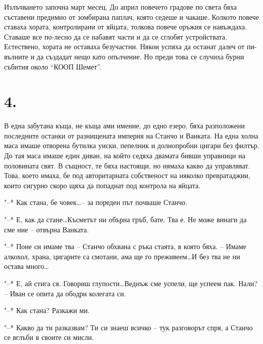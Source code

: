 \documentclass[ebook,openany,12pt]{memoir}
\begin{document}
Излъчването започна март месец. До април повечето градове по света бяха съставени предимно от зомбирана паплач, която седеше и чакаше. Колкото повече ставаха хората, контролирани от яйцата, толкова повече оръжия се навъждаха. Ставаше все по-лесно да се набавят части и да се сглобят устройствата. Естествено, хората не оставаха безучастни. Някои успяха да останат далеч от пи-вълните и да създадат нещо като опълчение. Но преди това се случиха бурни събития около ``КООП Шемет''.

\section*{4.}

В една забутана къща, не къща ами имение, до едно езеро, бяха разположени последните останки от разнищената империя на Станчо и Ванката. На една холна маса имаше отворена бутилка уиски, пепелник и долнопробни цигари без филтър. До тая маса имаше един диван, на който седяха двамата бивши управници на половината свят. В същност, те бяха настоящи, но нямаха какво да управляват. Това, което имаха, бе под авторитарната собственост на няколко превратаджии, които сигурно скоро щяха да попаднат под контрола на яйцата.

"--* Как стана, бе човек\ldots -- за пореден път почваше Станчо.

"--* Е, как да стане\ldots Късметът ни обърна гръб, бате. Тва е. Не може винаги да сме ние – отвърна Ванката.

"--* Поне си имаме тва – Станчо обхвана с ръка стаята, в която бяха. – Имаме алкохол, храна, цигарите са смотани, ама ще го преживеем\ldots И без тва не ни остава много\ldots

"--* Е, ай стига ся. Говориш глупости\ldots Веднъж сме успели, ще успеем пак. Нали? – Иван се опита да ободри колегата си.

"--* Как стана? Разкажи ми.

"--* Какво да ти разказвам? Ти си знаеш всичко – тук разговорът спря, а Станчо се вглъби в своите си мисли.
\end{document}
